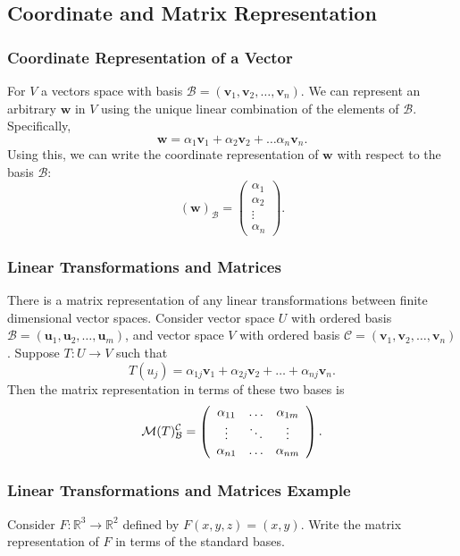 \documentclass{beamer}
\begin{document}
\subsection{Coordinate and Matrix Representation} 

\begin{frame}
\frametitle{Coordinate Representation of a Vector}
For $V$ a vectors space with basis $\mathcal{B} = ({\boldsymbol v_1}, {\boldsymbol  v_2},\ldots, {\boldsymbol  v_n})$. We can represent an arbitrary ${\boldsymbol  w}$ in $V$ using the unique linear combination of the elements of $\mathcal{B}$. Specifically, 
$$
{\boldsymbol  w} = \alpha_1 {\boldsymbol  v_1} + \alpha_2 {\boldsymbol  v_2} +\ldots \alpha_n {\boldsymbol  v_n}.
$$
Using this, we can write the coordinate representation of ${\boldsymbol  w}$ with respect to the basis $\mathcal{B}$:
$$
({\boldsymbol  w})_\mathcal{B} = \left(\begin{array}{c} \alpha_1\\ \alpha_2\\\vdots\\ \alpha_n\end{array}\right).
$$
\end{frame}

\begin{frame}
\frametitle{Linear Transformations and Matrices}
There is a matrix representation of any linear transformations between finite dimensional vector spaces. Consider vector space $U$ with ordered basis $\mathcal{B} = ({\boldsymbol u_1}, {\boldsymbol  u_2},\ldots, {\boldsymbol  u_m})$, and vector space $V$ with ordered basis $\mathcal{C} = ({\boldsymbol  v_1}, {\boldsymbol  v_2},\ldots, {\boldsymbol  v_n})$. Suppose $T: U\to V$ such that
$$
T(u_j) = \alpha_{1 j} {\boldsymbol  v_1} + \alpha_{2 j} {\boldsymbol  v_2} + \ldots + \alpha_{nj} {\boldsymbol  v_n}.
$$
Then the matrix representation in terms of these two bases is
$$
\mathcal{M}(T)_{\mathcal{B}}^{\mathcal{C}} = \left(\begin{array}{c c c c} \alpha_{11}	&	\ldots	&	\alpha_{1m}\\
												
													\vdots	& \ddots	&	\vdots\\
												\alpha_{n1}	&	\ldots	&	\alpha_{nm}\end{array}\right).
$$
\end{frame}

\begin{frame}[t]
\frametitle{Linear Transformations and Matrices Example}
\begin{Example}
Consider $F:\mathbb{R}^3\to \mathbb{R}^2$ defined by $F(x, y, z) = (x, y)$. Write the matrix representation of $F$ in terms of the standard bases.
\end{Example}

\end{frame}
\end{document}
